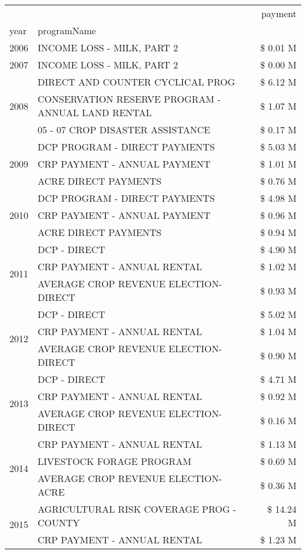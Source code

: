 \begin{tabular}{llr}
\toprule
 &  & payment \\
year & programName &  \\
\midrule
2006 & INCOME LOSS - MILK, PART 2 & \$ 0.01 M \\
\cline{1-3}
2007 & INCOME LOSS - MILK, PART 2 & \$ 0.00 M \\
\cline{1-3}
\multirow[t]{3}{*}{2008} & DIRECT AND COUNTER CYCLICAL PROG & \$ 6.12 M \\
 & CONSERVATION RESERVE PROGRAM - ANNUAL LAND RENTAL & \$ 1.07 M \\
 & 05 - 07 CROP DISASTER ASSISTANCE & \$ 0.17 M \\
\cline{1-3}
\multirow[t]{3}{*}{2009} & DCP PROGRAM - DIRECT PAYMENTS & \$ 5.03 M \\
 & CRP PAYMENT - ANNUAL PAYMENT & \$ 1.01 M \\
 & ACRE DIRECT PAYMENTS & \$ 0.76 M \\
\cline{1-3}
\multirow[t]{3}{*}{2010} & DCP PROGRAM - DIRECT PAYMENTS & \$ 4.98 M \\
 & CRP PAYMENT - ANNUAL PAYMENT & \$ 0.96 M \\
 & ACRE DIRECT PAYMENTS & \$ 0.94 M \\
\cline{1-3}
\multirow[t]{3}{*}{2011} & DCP - DIRECT & \$ 4.90 M \\
 & CRP PAYMENT - ANNUAL RENTAL & \$ 1.02 M \\
 & AVERAGE CROP REVENUE ELECTION-DIRECT & \$ 0.93 M \\
\cline{1-3}
\multirow[t]{3}{*}{2012} & DCP - DIRECT & \$ 5.02 M \\
 & CRP PAYMENT - ANNUAL RENTAL & \$ 1.04 M \\
 & AVERAGE CROP REVENUE ELECTION-DIRECT & \$ 0.90 M \\
\cline{1-3}
\multirow[t]{3}{*}{2013} & DCP - DIRECT & \$ 4.71 M \\
 & CRP PAYMENT - ANNUAL RENTAL & \$ 0.92 M \\
 & AVERAGE CROP REVENUE ELECTION-DIRECT & \$ 0.16 M \\
\cline{1-3}
\multirow[t]{3}{*}{2014} & CRP PAYMENT - ANNUAL RENTAL & \$ 1.13 M \\
 & LIVESTOCK FORAGE PROGRAM & \$ 0.69 M \\
 & AVERAGE CROP REVENUE ELECTION-ACRE & \$ 0.36 M \\
\cline{1-3}
\multirow[t]{3}{*}{2015} & AGRICULTURAL RISK COVERAGE PROG - COUNTY & \$ 14.24 M \\
 & CRP PAYMENT - ANNUAL RENTAL & \$ 1.23 M \\

\end{tabular}
